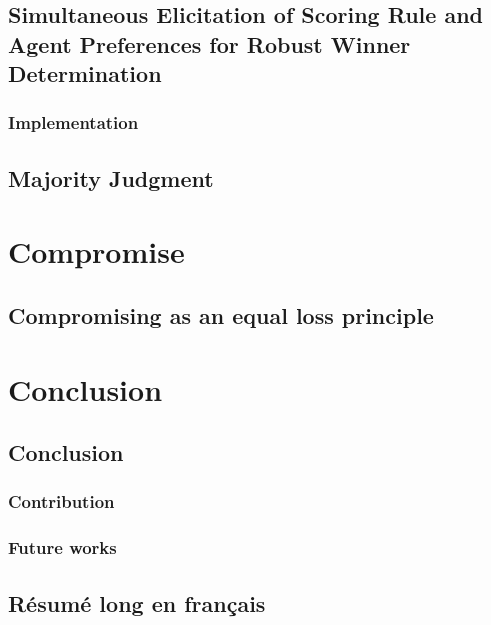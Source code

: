 \documentclass[a4paper, 11pt]{book}
\begin{document}
	\chapter[Simultaneous Elicitation of PSR and Agent Preferences]{Simultaneous Elicitation of Scoring Rule and Agent Preferences for Robust Winner Determination}
		\label{ch:minimax}
		\section{Implementation}
	\chapter{Majority Judgment}

\part{Compromise}
\chapter{Compromising as an equal loss principle}
\label{ch:compromise}
%	

\part{Conclusion}
	\chapter{Conclusion}
		\section{Contribution}
		\section{Future works}




\backmatter



 

\chapter{Résumé long en français}
\end{document}

